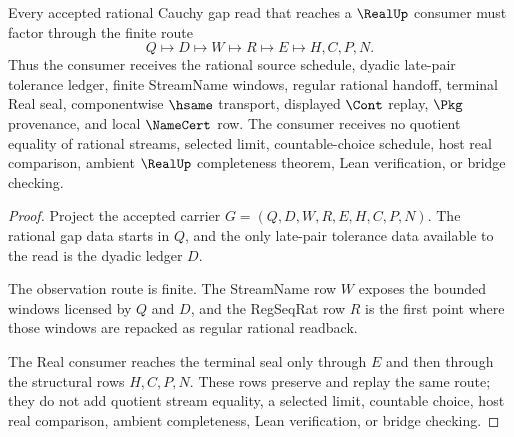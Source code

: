 \begin{theorem}
\label{thm:rational-cauchy-gap-real-handoff}
Every accepted rational Cauchy gap read that reaches a $\RealUp$ consumer must factor through the finite route
$$
Q \longmapsto D \longmapsto W \longmapsto R \longmapsto E \longmapsto H,C,P,N .
$$
Thus the consumer receives the rational source schedule, dyadic late-pair tolerance ledger, finite StreamName windows, regular rational handoff, terminal Real seal, componentwise $\hsame$ transport, displayed $\Cont$ replay, $\Pkg$ provenance, and local $\NameCert$ row. The consumer receives no quotient equality of rational streams, selected limit, countable-choice schedule, host real comparison, ambient $\RealUp$ completeness theorem, Lean verification, or bridge checking.
\end{theorem}
\begin{proof}
Project the accepted carrier $G=(Q,D,W,R,E,H,C,P,N)$. The rational gap data starts in $Q$, and the only late-pair tolerance data available to the read is the dyadic ledger $D$.

The observation route is finite. The StreamName row $W$ exposes the bounded windows licensed by $Q$ and $D$, and the RegSeqRat row $R$ is the first point where those windows are repacked as regular rational readback.

The Real consumer reaches the terminal seal only through $E$ and then through the structural rows $H,C,P,N$. These rows preserve and replay the same route; they do not add quotient stream equality, a selected limit, countable choice, host real comparison, ambient completeness, Lean verification, or bridge checking.
\end{proof}



